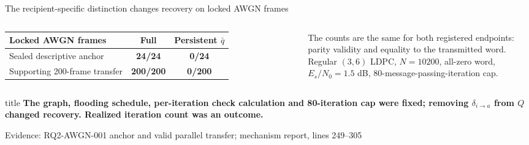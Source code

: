 \documentclass[aspectratio=169,9pt,t]{beamer}
\newcommand{\evidence}[1]{%
  \vfill\hfill{\fontsize{5.8}{6.8}\selectfont\color{Muted}Evidence: #1}}
\newcommand{\takeaway}[1]{%
  \begin{beamercolorbox}[rounded=true,sep=1.5ex]{title}
    \centering\normalsize\bfseries #1
  \end{beamercolorbox}}
\begin{document}
\begin{frame}{The recipient-specific distinction changes recovery on locked AWGN frames}
  \begin{columns}[c,onlytextwidth]
    \centering
    \renewcommand{\arraystretch}{1.35}
    \begin{tabular}{>{\raggedright\arraybackslash}p{4.1cm}cc}
      \toprule
      \textbf{Locked AWGN frames} & \textbf{Full} & \textbf{Persistent $\bar q$}\\
      \midrule
      Sealed descriptive anchor & \textcolor{Good}{\bfseries 24/24} & \textcolor{Bad}{\bfseries 0/24}\\
      Supporting 200-frame transfer & \textcolor{Good}{\bfseries 200/200} & \textcolor{Bad}{\bfseries 0/200}\\
      \bottomrule
    \end{tabular}

    \vspace{4mm}
    {\small The counts are the same for both registered endpoints: parity validity and equality to the transmitted word.\\[1mm]
      \scriptsize Regular $(3,6)$ LDPC, $N=10200$, all-zero word, $E_s/N_0=1.5$ dB, 80-message-passing-iteration cap.}

  \end{columns}

  \vspace{1mm}
  \takeaway{The graph, flooding schedule, per-iteration check calculation and 80-iteration cap were fixed; removing $\delta_{i\to a}$ from $Q$ changed recovery. Realized iteration count was an outcome.}
  \evidence{RQ2-AWGN-001 anchor and valid parallel transfer; mechanism report, lines 249--305}
\end{frame}
\end{document}
